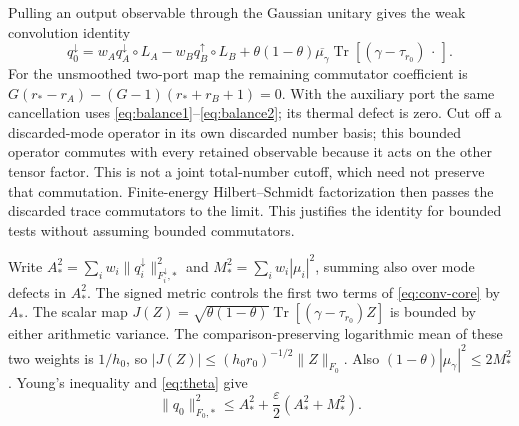 \documentclass[11pt]{article}
\newcommand{\Tr}{\operatorname{Tr}}
\theoremstyle{remark}\newtheorem{remark}[theorem]{Remark}
\begin{document}
Pulling an output observable through the Gaussian unitary gives the
weak convolution identity
\begin{equation}\label{eq:conv-core}
 q_0^\downarrow=w_A q_A^\downarrow\circ L_A
 -w_B q_B^\uparrow\circ L_B
 +\theta(1-\theta)\overline{\mu_\gamma}
       \Tr[(\gamma-\tau_{r_0})\,\cdot\,].
\end{equation}
For the unsmoothed two-port map the remaining commutator coefficient is
$G(r_*-r_A)-(G-1)(r_*+r_B+1)=0$.
With the auxiliary port the same cancellation uses
\eqref{eq:balance1}--\eqref{eq:balance2}; its thermal defect is zero.
Cut off a discarded-mode operator in its own discarded number basis;
this bounded operator commutes with every retained observable because it
acts on the other tensor factor. This is not a joint total-number cutoff,
which need not preserve that commutation. Finite-energy Hilbert--Schmidt
factorization then passes the discarded trace commutators to the limit. This justifies the identity for bounded tests without
assuming bounded commutators.

Write $A_*^2=\sum_iw_i\|q_i^\downarrow\|_{F_i^\downarrow,*}^2$ and
$M_*^2=\sum_iw_i|\mu_i|^2$, summing also over mode defects in $A_*^2$.
The signed metric controls the first two terms of \eqref{eq:conv-core}
by $A_*$. The scalar map
$J(Z)=\sqrt{\theta(1-\theta)}\Tr[(\gamma-\tau_{r_0})Z]$
is bounded by either arithmetic variance. The comparison-preserving
logarithmic mean of these two weights is $1/h_0$, so
$|J(Z)|\le (h_0r_0)^{-1/2}\|Z\|_{F_0}$.
Also $(1-\theta)|\mu_\gamma|^2\le2M_*^2$.
Young's inequality and \eqref{eq:theta} give
\begin{equation}\label{eq:defect-bound-core}
 \|q_0\|_{F_0,*}^2\le A_*^2+\frac\varepsilon2(A_*^2+M_*^2).
\end{equation}
\end{document}
